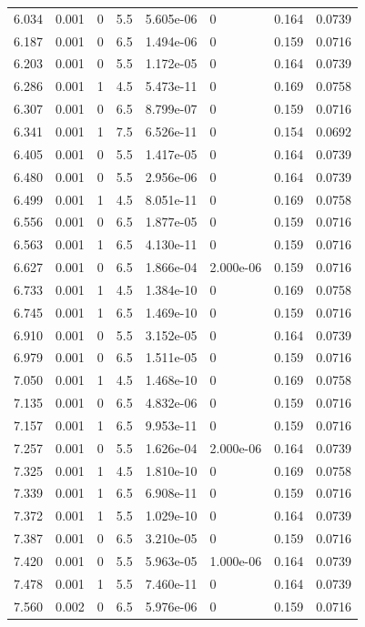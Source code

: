 \documentclass[preview]{standalone}
\begin{document}
{{{\begin{tabular}{L{1.2cm}C{1.2cm} C{0.3cm}C{0.5cm} C{1.4cm}C{1.4cm} C{1.4cm}C{1.4cm}}
  6.034  &  0.001  & 0     & 5.5 &  5.605e-06  & 0  & 0.164 &  0.0739   \\ 
  6.187  &  0.001  & 0     & 6.5 &  1.494e-06  & 0  & 0.159 &  0.0716   \\ 
  6.203  &  0.001  & 0     & 5.5 &  1.172e-05  & 0  & 0.164 &  0.0739   \\ 
  6.286  &  0.001  & 1     & 4.5 &  5.473e-11  & 0  & 0.169 &  0.0758   \\ 
  6.307  &  0.001  & 0     & 6.5 &  8.799e-07  & 0  & 0.159 &  0.0716   \\ 
  6.341  &  0.001  & 1     & 7.5 &  6.526e-11  & 0  & 0.154 &  0.0692   \\ 
  6.405  &  0.001  & 0     & 5.5 &  1.417e-05  & 0  & 0.164 &  0.0739   \\ 
  6.480  &  0.001  & 0     & 5.5 &  2.956e-06  & 0  & 0.164 &  0.0739   \\ 
  6.499  &  0.001  & 1     & 4.5 &  8.051e-11  & 0  & 0.169 &  0.0758   \\ 
  6.556  &  0.001  & 0     & 6.5 &  1.877e-05  & 0  & 0.159 &  0.0716   \\ 
  6.563  &  0.001  & 1     & 6.5 &  4.130e-11  & 0  & 0.159 &  0.0716   \\ 
  6.627  &  0.001  & 0     & 6.5 &  1.866e-04  & 2.000e-06  & 0.159 &  0.0716   \\ 
  6.733  &  0.001  & 1     & 4.5 &  1.384e-10  & 0  & 0.169 &  0.0758   \\ 
  6.745  &  0.001  & 1     & 6.5 &  1.469e-10  & 0  & 0.159 &  0.0716   \\ 
  6.910  &  0.001  & 0     & 5.5 &  3.152e-05  & 0  & 0.164 &  0.0739   \\ 
  6.979  &  0.001  & 0     & 6.5 &  1.511e-05  & 0  & 0.159 &  0.0716   \\ 
  7.050  &  0.001  & 1     & 4.5 &  1.468e-10  & 0  & 0.169 &  0.0758   \\ 
  7.135  &  0.001  & 0     & 6.5 &  4.832e-06  & 0  & 0.159 &  0.0716   \\ 
  7.157  &  0.001  & 1     & 6.5 &  9.953e-11  & 0  & 0.159 &  0.0716   \\ 
  7.257  &  0.001  & 0     & 5.5 &  1.626e-04  & 2.000e-06  & 0.164 &  0.0739   \\ 
  7.325  &  0.001  & 1     & 4.5 &  1.810e-10  & 0  & 0.169 &  0.0758   \\ 
  7.339  &  0.001  & 1     & 6.5 &  6.908e-11  & 0  & 0.159 &  0.0716   \\ 
  7.372  &  0.001  & 1     & 5.5 &  1.029e-10  & 0  & 0.164 &  0.0739   \\ 
  7.387  &  0.001  & 0     & 6.5 &  3.210e-05  & 0  & 0.159 &  0.0716   \\ 
  7.420  &  0.001  & 0     & 5.5 &  5.963e-05  & 1.000e-06  & 0.164 &  0.0739   \\ 
  7.478  &  0.001  & 1     & 5.5 &  7.460e-11  & 0  & 0.164 &  0.0739   \\ 
  7.560  &  0.002  & 0     & 6.5 &  5.976e-06  & 0  & 0.159 &  0.0716   \\ 
\hline 
\end{tabular} 

}}}
\end{document}
